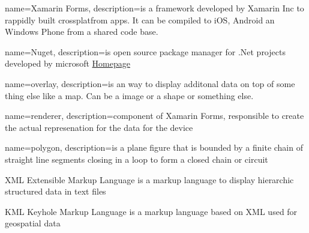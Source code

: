 
{
  name=Xamarin Forms,
  description={is a framework developed by Xamarin Inc to rappidly built crossplatfrom apps. It can be compiled to iOS, Android an Windows Phone from a shared code base.}
}

{
  name=Nuget,
  description={is open source package manager for .Net projects developed by microsoft
  \href{http://nuget.codeplex.com/}{Homepage} }
}

{
  name=overlay,
  description={is an way to display additonal data on top of some thing else like a map. Can be a image or a shape or something else.}
}

{
  name=renderer,
  description={component of Xamarin Forms, responsible to create the actual represenation for the data for the device}
}

{
  name=polygon,
  description={is a plane figure that is bounded by a finite chain of straight line segments closing in a loop to form a closed chain or circuit}
}


  {XML}            %
  {Extensible Markup Language}  %
  {is a markup language to display hierarchic structured data in text files} %

  {KML}            %
  {Keyhole Markup Language}  %
  {is a markup language based on XML used for geospatial data} %